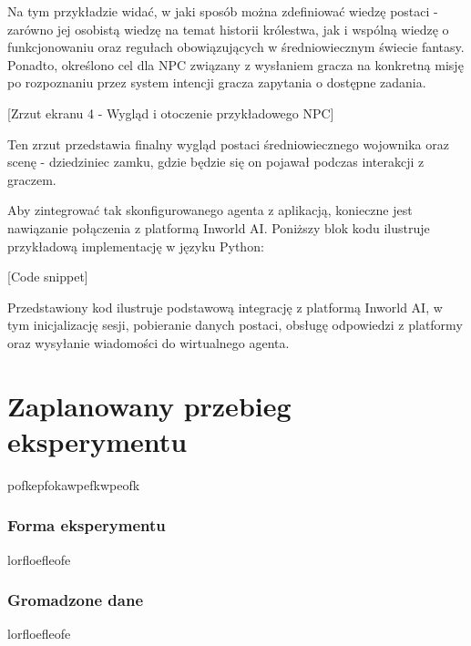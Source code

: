 Na tym przykładzie widać, w jaki sposób można zdefiniować wiedzę postaci - zarówno jej osobistą
wiedzę na temat historii królestwa, jak i wspólną wiedzę o funkcjonowaniu oraz regułach obowiązujących
w średniowiecznym świecie fantasy. Ponadto, określono cel dla NPC związany z wysłaniem gracza na
konkretną misję po rozpoznaniu przez system intencji gracza zapytania o dostępne zadania.

    [Zrzut ekranu 4 - Wygląd i otoczenie przykładowego NPC]

Ten zrzut przedstawia finalny wygląd postaci średniowiecznego wojownika oraz scenę - dziedziniec
zamku, gdzie będzie się on pojawał podczas interakcji z graczem.

Aby zintegrować tak skonfigurowanego agenta z aplikacją, konieczne jest nawiązanie połączenia z
platformą Inworld AI. Poniższy blok kodu ilustruje przykładową implementację w języku Python:

[Code snippet]

Przedstawiony kod ilustruje podstawową integrację z platformą Inworld AI, w tym inicjalizację sesji,
pobieranie danych postaci, obsługę odpowiedzi z platformy oraz wysyłanie wiadomości do wirtualnego agenta.

\section{Zaplanowany przebieg eksperymentu}\label{section:ch4_3}

pofkepfokawpefkwpeofk

\subsubsection*{Forma eksperymentu}

lorfloefleofe

\subsubsection*{Gromadzone dane}

lorfloefleofe